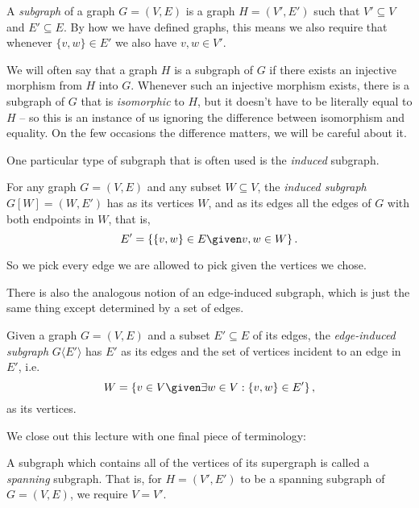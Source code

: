\documentclass[nobib]{tufte-handout}
\begin{document}
\begin{definition}
  A \emph{subgraph} of a graph $G = (V,E)$ is a graph $H = (V', E')$ such that $V' \subseteq V$ and $E' \subseteq E$. By how we have defined graphs, this means we also require that whenever $\{v,w\} \in E'$ we also have $v, w \in V'$.

  We will often say that a graph $H$ is a subgraph of $G$ if there exists an injective morphism from $H$ into $G$. Whenever such an injective morphism exists, there is a subgraph of $G$ that is \emph{isomorphic} to $H$, but it doesn't have to be literally equal to $H$ -- so this is an instance of us ignoring the difference between isomorphism and equality. On the few occasions the difference matters, we will be careful about it.
\end{definition}

One particular type of subgraph that is often used is the \emph{induced} subgraph.

\begin{definition}
  For any graph $G = (V, E)$ and any subset $W \subseteq V$, the \emph{induced subgraph} $G[W] = (W, E')$ has as its vertices $W$, and as its edges all the edges of $G$ with both endpoints in $W$, that is,
  $$E' = \left\{\{v, w\} \in E \given v, w \in W\right\}.$$

  So we pick every edge we are allowed to pick given the vertices we chose.
\end{definition}

There is also the analogous notion of an edge-induced subgraph, which is just the same thing except determined by a set of edges.

\begin{definition}
  Given a graph $G = (V, E)$ and a subset $E' \subseteq E$ of its edges, the \emph{edge-induced subgraph} $G\langle E' \rangle$ has $E'$ as its edges and the set of vertices incident to an edge in $E'$, i.e.
  $$W = \left\{v \in V \given \exists w \in V: \{v, w\} \in E'\right\},$$
  as its vertices.
\end{definition}

We close out this lecture with one final piece of terminology:

\begin{definition}
  A subgraph which contains all of the vertices of its supergraph is called a \emph{spanning} subgraph. That is, for $H = (V',E')$ to be a spanning subgraph of $G = (V,E)$, we require $V = V'$.
\end{definition}
\end{document}
